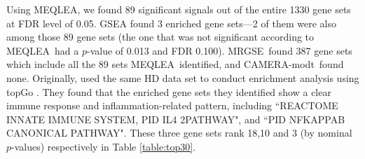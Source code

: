\documentclass[a4,center,fleqn]{NAR}
\newcommand{\OurMethod}{MEQLEA}
\newcommand{\CMT}{CAMERA-modt}
\newcommand{\genr}{MRGSE}
\begin{document}
	
	Using \OurMethod, we found 89 significant signals out of the entire 1330 gene sets at FDR level
	of 0.05. GSEA found 3 enriched gene sets---2 of them were also among those 89 gene sets (the one
	that was not significant according to \OurMethod~had a $p$-value of 0.013 and FDR 0.100).
	\genr~found 387 gene sets which include all the 89 sets \OurMethod~identified, and \CMT~found none.
	Originally, \citet{labadorf2015rna} used the same HD data set to conduct enrichment analysis using
	topGo \citep{alexa2010topgo}. They found that the enriched gene sets they identified show a clear
	immune response and inflammation-related pattern, including ``REACTOME INNATE IMMUNE SYSTEM, PID IL4
	2PATHWAY", and ``PID NFKAPPAB CANONICAL PATHWAY". These three gene sets rank 18,10 and 3 (by nominal
	$p$-values) respectively in Table \ref{table:top30}.
	
\end{document}
